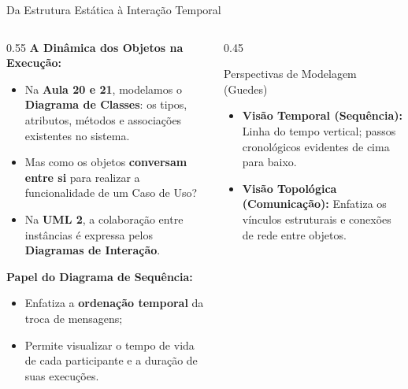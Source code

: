 \documentclass[10pt]{beamer}
\begin{document}
\begin{frame}{Da Estrutura Estática à Interação Temporal}
    \begin{columns}
        \begin{column}{0.55\textwidth}
            \textbf{A Dinâmica dos Objetos na Execução:}
            \begin{itemize}
                \item Na \textbf{Aula 20 e 21}, modelamos o \textbf{Diagrama de Classes}: os tipos, atributos, métodos e associações existentes no sistema.
                \item Mas como os objetos \textbf{conversam entre si} para realizar a funcionalidade de um Caso de Uso?
                \item Na \textbf{UML 2}, a colaboração entre instâncias é expressa pelos \textbf{Diagramas de Interação}.
            \end{itemize}
            \vspace{0.2cm}
            \textbf{Papel do Diagrama de Sequência:}
            \begin{itemize}
                \item Enfatiza a \textbf{ordenação temporal} da troca de mensagens;
                \item Permite visualizar o tempo de vida de cada participante e a duração de suas execuções.
            \end{itemize}
        \end{column}
        \begin{column}{0.45\textwidth}
            \begin{block}{Perspectivas de Modelagem (Guedes)}
                \begin{itemize}
                    \item \textbf{Visão Temporal (Sequência):} Linha do tempo vertical; passos cronológicos evidentes de cima para baixo.
                    \item \textbf{Visão Topológica (Comunicação):} Enfatiza os vínculos estruturais e conexões de rede entre objetos.
                \end{itemize}
            \end{block}
        \end{column}
    \end{columns}
\end{frame}
\end{document}
